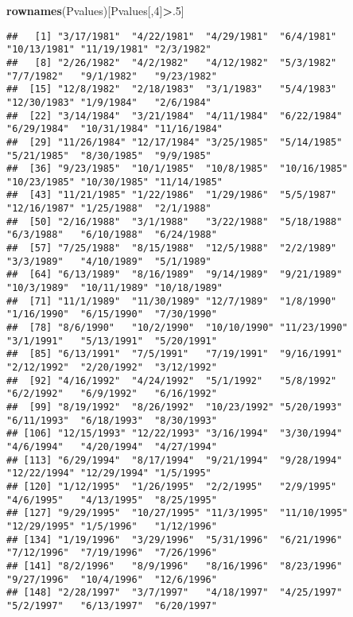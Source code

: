 \documentclass[]{article}
\newenvironment{Shaded}{\begin{snugshade}}{\end{snugshade}}
\newcommand{\KeywordTok}[1]{\textcolor[rgb]{0.13,0.29,0.53}{\textbf{#1}}}
\newcommand{\DecValTok}[1]{\textcolor[rgb]{0.00,0.00,0.81}{#1}}
\newcommand{\OperatorTok}[1]{\textcolor[rgb]{0.81,0.36,0.00}{\textbf{#1}}}
\newcommand{\NormalTok}[1]{#1}
\begin{document}
\begin{Shaded}
\begin{Highlighting}[]
\KeywordTok{rownames}\NormalTok{(Pvalues)[Pvalues[,}\DecValTok{4}\NormalTok{]}\OperatorTok{>}\NormalTok{.}\DecValTok{5}\NormalTok{]}
\end{Highlighting}
\end{Shaded}

\begin{verbatim}
##   [1] "3/17/1981"  "4/22/1981"  "4/29/1981"  "6/4/1981"   "10/13/1981" "11/19/1981" "2/3/1982"  
##   [8] "2/26/1982"  "4/2/1982"   "4/12/1982"  "5/3/1982"   "7/7/1982"   "9/1/1982"   "9/23/1982" 
##  [15] "12/8/1982"  "2/18/1983"  "3/1/1983"   "5/4/1983"   "12/30/1983" "1/9/1984"   "2/6/1984"  
##  [22] "3/14/1984"  "3/21/1984"  "4/11/1984"  "6/22/1984"  "6/29/1984"  "10/31/1984" "11/16/1984"
##  [29] "11/26/1984" "12/17/1984" "3/25/1985"  "5/14/1985"  "5/21/1985"  "8/30/1985"  "9/9/1985"  
##  [36] "9/23/1985"  "10/1/1985"  "10/8/1985"  "10/16/1985" "10/23/1985" "10/30/1985" "11/14/1985"
##  [43] "11/21/1985" "1/22/1986"  "1/29/1986"  "5/5/1987"   "12/16/1987" "1/25/1988"  "2/1/1988"  
##  [50] "2/16/1988"  "3/1/1988"   "3/22/1988"  "5/18/1988"  "6/3/1988"   "6/10/1988"  "6/24/1988" 
##  [57] "7/25/1988"  "8/15/1988"  "12/5/1988"  "2/2/1989"   "3/3/1989"   "4/10/1989"  "5/1/1989"  
##  [64] "6/13/1989"  "8/16/1989"  "9/14/1989"  "9/21/1989"  "10/3/1989"  "10/11/1989" "10/18/1989"
##  [71] "11/1/1989"  "11/30/1989" "12/7/1989"  "1/8/1990"   "1/16/1990"  "6/15/1990"  "7/30/1990" 
##  [78] "8/6/1990"   "10/2/1990"  "10/10/1990" "11/23/1990" "3/1/1991"   "5/13/1991"  "5/20/1991" 
##  [85] "6/13/1991"  "7/5/1991"   "7/19/1991"  "9/16/1991"  "2/12/1992"  "2/20/1992"  "3/12/1992" 
##  [92] "4/16/1992"  "4/24/1992"  "5/1/1992"   "5/8/1992"   "6/2/1992"   "6/9/1992"   "6/16/1992" 
##  [99] "8/19/1992"  "8/26/1992"  "10/23/1992" "5/20/1993"  "6/11/1993"  "6/18/1993"  "8/30/1993" 
## [106] "12/15/1993" "12/22/1993" "3/16/1994"  "3/30/1994"  "4/6/1994"   "4/20/1994"  "4/27/1994" 
## [113] "6/29/1994"  "8/17/1994"  "9/21/1994"  "9/28/1994"  "12/22/1994" "12/29/1994" "1/5/1995"  
## [120] "1/12/1995"  "1/26/1995"  "2/2/1995"   "2/9/1995"   "4/6/1995"   "4/13/1995"  "8/25/1995" 
## [127] "9/29/1995"  "10/27/1995" "11/3/1995"  "11/10/1995" "12/29/1995" "1/5/1996"   "1/12/1996" 
## [134] "1/19/1996"  "3/29/1996"  "5/31/1996"  "6/21/1996"  "7/12/1996"  "7/19/1996"  "7/26/1996" 
## [141] "8/2/1996"   "8/9/1996"   "8/16/1996"  "8/23/1996"  "9/27/1996"  "10/4/1996"  "12/6/1996" 
## [148] "2/28/1997"  "3/7/1997"   "4/18/1997"  "4/25/1997"  "5/2/1997"   "6/13/1997"  "6/20/1997" 

\end{verbatim}
\end{document}
